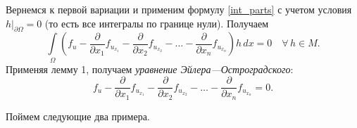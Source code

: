 \documentclass[12pt,a5paper]{book}
\begin{document}
	Вернемся к первой вариации и применим формулу \eqref{int_parts} с учетом условия $h|_{\partial\Omega} = 0$ (то есть все интегралы по границе нули). Получаем
	\begin{equation*}
		\int\limits_\Omega \left(f_u - \frac{\partial}{\partial x_1}f_{u_{x_1}} - \frac{\partial}{\partial x_2}f_{u_{x_2}} - \dots - \frac{\partial}{\partial x_n}f_{u_{x_n}}\right)h\,dx = 0 \quad \forall\,h \in M.
	\end{equation*}
	Применяя лемму 1, получаем \emph{уравнение Эйлера---Остроградского}:
	\begin{equation*}
		f_u - \frac{\partial}{\partial x_1}f_{u_{x_1}} - \frac{\partial}{\partial x_2}f_{u_{x_2}} - \dots - \frac{\partial}{\partial x_n}f_{u_{x_n}} = 0.
	\end{equation*}
	
	Поймем следующие два примера.
\end{document}
